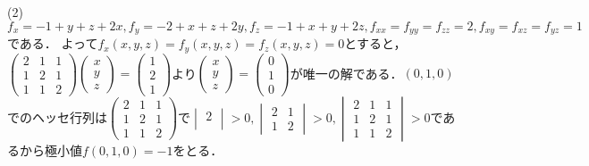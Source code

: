\documentclass[
		book,
		head_space=20mm,
		foot_space=20mm,
		gutter=10mm,
		line_length=190mm
]{jlreq}
\begin{document}
(2)$f_x=-1+y+z+2x,f_y=-2+x+z+2y,f_z=-1+x+y+2z,f_{xx}=f_{yy}=f_{zz}=2,f_{xy}=f_{xz}=f_{yz}=1$である．
よって$f_x(x,y,z)=f_y(x,y,z)=f_z(x,y,z)=0$とすると，$\begin{pmatrix}
	2 & 1 & 1 \\
	1 & 2 & 1 \\
	1 & 1 & 2
\end{pmatrix}\begin{pmatrix}
	x \\
	y \\
	z
\end{pmatrix}=\begin{pmatrix}
	1\\
	2\\
	1
\end{pmatrix}$より$\begin{pmatrix}
	x \\
	y \\
	z
\end{pmatrix}=\begin{pmatrix}
	0\\
	1\\
	0
\end{pmatrix}$が唯一の解である．$(0,1,0)$でのヘッセ行列は$\begin{pmatrix}
	2 & 1 & 1 \\
	1 & 2 & 1 \\
	1 & 1 & 2
\end{pmatrix}$で$\begin{vmatrix}
	2\\
\end{vmatrix}>0,\begin{vmatrix}
	2 & 1 \\
	1 & 2
\end{vmatrix}>0,\begin{vmatrix}
	2 & 1 & 1 \\
	1 & 2 & 1 \\
	1 & 1 & 2
\end{vmatrix}>0$であるから極小値$f(0,1,0)=-1$をとる．
\end{document}
